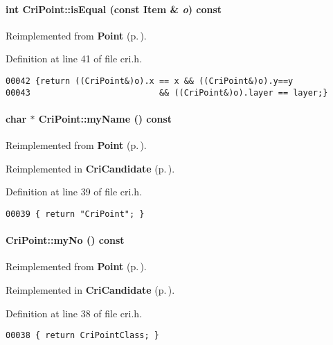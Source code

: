 \paragraph{\setlength{\rightskip}{0pt plus 5cm}int Cri\-Point::is\-Equal (const {\bf Item} \& {\em o}) const\hspace{0.3cm}{\tt  [inline, virtual]}}\hfill



Reimplemented from {\bf Point} {\rm (p.\,\pageref{Point_a7})}.

Definition at line 41 of file cri.h.\small\begin{verbatim}00042 {return ((CriPoint&)o).x == x && ((CriPoint&)o).y==y
00043                          && ((CriPoint&)o).layer == layer;}
\end{verbatim}\normalsize 
\label{CriPoint_a4}
\paragraph{\setlength{\rightskip}{0pt plus 5cm}char $\ast$ Cri\-Point::my\-Name () const\hspace{0.3cm}{\tt  [inline, virtual]}}\hfill



Reimplemented from {\bf Point} {\rm (p.\,\pageref{Point_a5})}.

Reimplemented in {\bf Cri\-Candidate} {\rm (p.\,\pageref{CriCandidate_a3})}.

Definition at line 39 of file cri.h.\small\begin{verbatim}00039 { return "CriPoint"; }
\end{verbatim}\normalsize 
\label{CriPoint_a3}
\paragraph{ Cri\-Point::my\-No () const\hspace{0.3cm}{\tt  [inline, virtual]}}\hfill



Reimplemented from {\bf Point} {\rm (p.\,\pageref{Point_a4})}.

Reimplemented in {\bf Cri\-Candidate} {\rm (p.\,\pageref{CriCandidate_a2})}.

Definition at line 38 of file cri.h.\small\begin{verbatim}00038 { return CriPointClass; }
\end{verbatim}\normalsize 
\label{CriPoint_a5}
